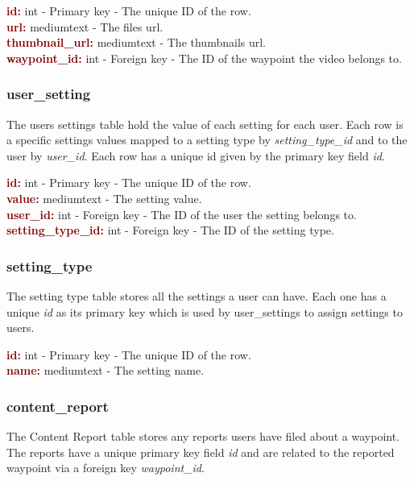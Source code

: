 \documentclass[11pt,a4paper]{report}
\begin{document}
\textbf{\textcolor{Maroon}{id:}} int - Primary key - The unique ID of the row. \\
\textbf{\textcolor{Maroon}{url:}} mediumtext -  The files url.\\
\textbf{\textcolor{Maroon}{thumbnail\_url:}} mediumtext - The thumbnails url.\\
\textbf{\textcolor{Maroon}{waypoint\_id:}} int - Foreign key - The ID of the waypoint the video belongs to.

\subsubsection{user\_setting}
The users settings table hold the value of each setting for each user. Each row is a specific settings values mapped to a setting type by \textit{setting\_type\_id} and to the user by \textit{user\_id}. Each row has a unique id given by the primary key field \textit{id}.

\textbf{\textcolor{Maroon}{id:}} int - Primary key - The unique ID of the row. \\
\textbf{\textcolor{Maroon}{value:}} mediumtext -  The setting value.\\
\textbf{\textcolor{Maroon}{user\_id:}} int - Foreign key - The ID of the user the setting belongs to.\\
\textbf{\textcolor{Maroon}{setting\_type\_id:}} int - Foreign key - The ID of the setting type.

\subsubsection{setting\_type}
The setting type table stores all the settings a user can have. Each one has a unique \textit{id} as its primary key which is used by user\_settings to assign settings to users.

\textbf{\textcolor{Maroon}{id:}} int - Primary key - The unique ID of the row. \\
\textbf{\textcolor{Maroon}{name:}} mediumtext -  The setting name.\\

\subsubsection{content\_report}
The Content Report table stores any reports users have filed about a waypoint. The reports have a unique primary key field \textit{id} and are related to the reported waypoint via a foreign key \textit{waypoint\_id}. 
\end{document}
